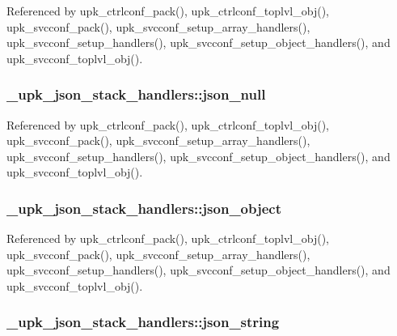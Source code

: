 Referenced by upk\_\-ctrlconf\_\-pack(), upk\_\-ctrlconf\_\-toplvl\_\-obj(), upk\_\-svcconf\_\-pack(), upk\_\-svcconf\_\-setup\_\-array\_\-handlers(), upk\_\-svcconf\_\-setup\_\-handlers(), upk\_\-svcconf\_\-setup\_\-object\_\-handlers(), and upk\_\-svcconf\_\-toplvl\_\-obj().

\subsubsection[{json\_\-null}]{ {\bf \_\-upk\_\-json\_\-stack\_\-handlers::json\_\-null}}\label{struct__upk__json__stack__handlers_a90adb4bb9574408dbf120641f5bcc121}


Referenced by upk\_\-ctrlconf\_\-pack(), upk\_\-ctrlconf\_\-toplvl\_\-obj(), upk\_\-svcconf\_\-pack(), upk\_\-svcconf\_\-setup\_\-array\_\-handlers(), upk\_\-svcconf\_\-setup\_\-handlers(), upk\_\-svcconf\_\-setup\_\-object\_\-handlers(), and upk\_\-svcconf\_\-toplvl\_\-obj().

\subsubsection[{json\_\-object}]{ {\bf \_\-upk\_\-json\_\-stack\_\-handlers::json\_\-object}}\label{struct__upk__json__stack__handlers_a4333aaeebbe90aada241ed25e77a5f1d}


Referenced by upk\_\-ctrlconf\_\-pack(), upk\_\-ctrlconf\_\-toplvl\_\-obj(), upk\_\-svcconf\_\-pack(), upk\_\-svcconf\_\-setup\_\-array\_\-handlers(), upk\_\-svcconf\_\-setup\_\-handlers(), upk\_\-svcconf\_\-setup\_\-object\_\-handlers(), and upk\_\-svcconf\_\-toplvl\_\-obj().

\subsubsection[{json\_\-string}]{ {\bf \_\-upk\_\-json\_\-stack\_\-handlers::json\_\-string}}\label{struct__upk__json__stack__handlers_a15a461cc1feaa19a8efa26791dad2552}


